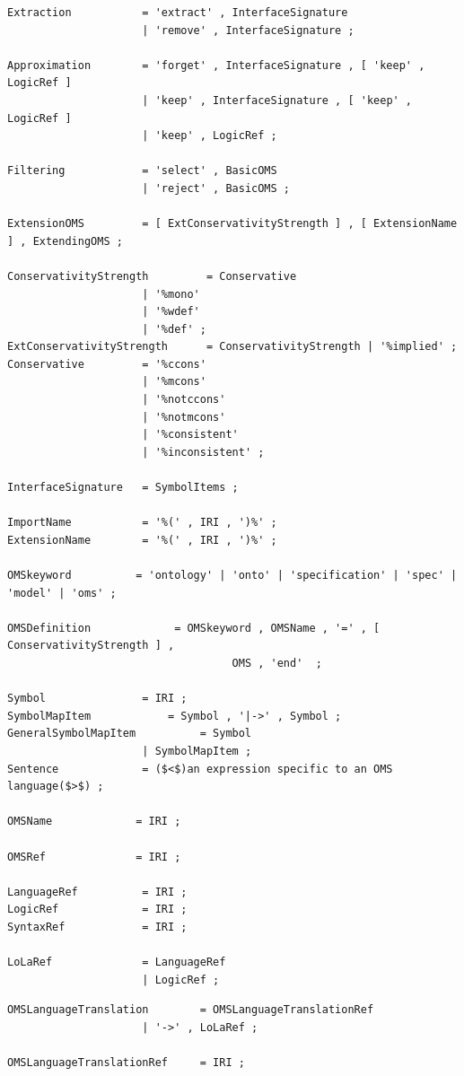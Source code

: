 \documentclass[10pt,fleqn,final]{scrreprt}
\newenvironment{definitions}[0]{\medskip }{}
\begin{document}
\begin{definitions}
\begin{lstlisting}[language=ebnf,escapeinside={()},mathescape]
Extraction           = 'extract' , InterfaceSignature
                     | 'remove' , InterfaceSignature ;

Approximation        = 'forget' , InterfaceSignature , [ 'keep' , LogicRef ] 
                     | 'keep' , InterfaceSignature , [ 'keep' , LogicRef ] 
                     | 'keep' , LogicRef ;

Filtering            = 'select' , BasicOMS 
                     | 'reject' , BasicOMS ;

ExtensionOMS         = [ ExtConservativityStrength ] , [ ExtensionName ] , ExtendingOMS ;

ConservativityStrength         = Conservative
                     | '%mono'
                     | '%wdef'
                     | '%def' ;
ExtConservativityStrength      = ConservativityStrength | '%implied' ;
Conservative         = '%ccons'
                     | '%mcons'  
                     | '%notccons'  
                     | '%notmcons'  
                     | '%consistent'  
                     | '%inconsistent' ; 

InterfaceSignature   = SymbolItems ;

ImportName           = '%(' , IRI , ')%' ;
ExtensionName        = '%(' , IRI , ')%' ;

OMSkeyword          = 'ontology' | 'onto' | 'specification' | 'spec' | 'model' | 'oms' ;

OMSDefinition             = OMSkeyword , OMSName , '=' , [ ConservativityStrength ] , 
                                   OMS , 'end'  ; 

Symbol               = IRI ;
SymbolMapItem            = Symbol , '|->' , Symbol ;
GeneralSymbolMapItem          = Symbol
                     | SymbolMapItem ;
Sentence             = ($<$)an expression specific to an OMS language($>$) ;

OMSName             = IRI ;

OMSRef              = IRI ;

LanguageRef          = IRI ;
LogicRef             = IRI ;
SyntaxRef            = IRI ;

LoLaRef              = LanguageRef
                     | LogicRef ;
\end{lstlisting}

\begin{lstlisting}[language=ebnf,mathescape]
OMSLanguageTranslation        = OMSLanguageTranslationRef
                     | '->' , LoLaRef ;

OMSLanguageTranslationRef     = IRI ;
\end{lstlisting}


\end{definitions}
\end{document}
